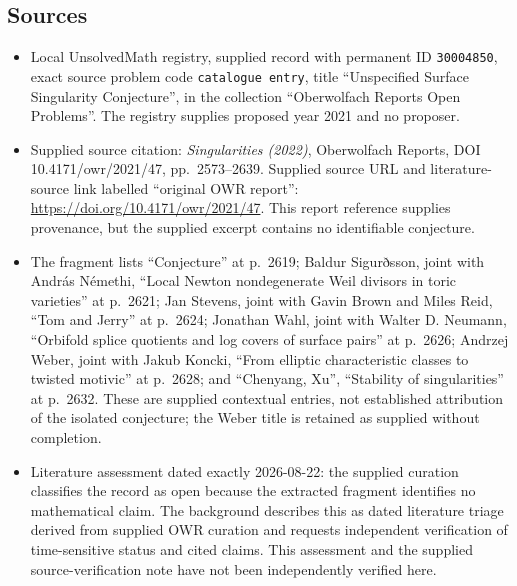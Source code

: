 \documentclass[11pt]{article}
\begin{document}
\subsection{Sources}
\begin{itemize}
\item Local UnsolvedMath registry, supplied record with permanent ID \texttt{30004850}, exact source problem code \texttt{catalogue entry}, title ``Unspecified Surface Singularity Conjecture'', in the collection ``Oberwolfach Reports Open Problems''. The registry supplies proposed year 2021 and no proposer.
\item Supplied source citation: \emph{Singularities (2022)}, Oberwolfach Reports, DOI 10.4171/owr/2021/47, pp.\ 2573--2639. Supplied source URL and literature-source link labelled ``original OWR report'': \url{https://doi.org/10.4171/owr/2021/47}. This report reference supplies provenance, but the supplied excerpt contains no identifiable conjecture.
\item The fragment lists ``Conjecture'' at p.\ 2619; Baldur Sigurðsson, joint with András Némethi, ``Local Newton nondegenerate Weil divisors in toric varieties'' at p.\ 2621; Jan Stevens, joint with Gavin Brown and Miles Reid, ``Tom and Jerry'' at p.\ 2624; Jonathan Wahl, joint with Walter D. Neumann, ``Orbifold splice quotients and log covers of surface pairs'' at p.\ 2626; Andrzej Weber, joint with Jakub Koncki, ``From elliptic characteristic classes to twisted motivic'' at p.\ 2628; and ``Chenyang, Xu'', ``Stability of singularities'' at p.\ 2632. These are supplied contextual entries, not established attribution of the isolated conjecture; the Weber title is retained as supplied without completion.
\item Literature assessment dated exactly 2026-08-22: the supplied curation classifies the record as open because the extracted fragment identifies no mathematical claim. The background describes this as dated literature triage derived from supplied OWR curation and requests independent verification of time-sensitive status and cited claims. This assessment and the supplied source-verification note have not been independently verified here.
\end{itemize}
\end{document}
